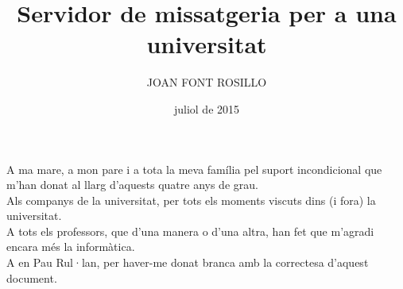 \documentclass[catalan,GINF]{TFGEPSUIB}
\title{Servidor de missatgeria per a una universitat}
\author{\MakeUppercase{Joan Font Rosillo}}
\date{juliol de 2015}
\begin{document}
\portada
\frontmatter

\cleartorecto \thispagestyle{empty}
\begin{agraiments}
A ma mare, a mon pare i a tota la meva família pel suport incondicional que m'han donat al llarg d'aquests quatre anys de grau.\\

Als companys de la universitat, per tots els moments viscuts dins (i fora) la universitat.\\

A tots els professors, que d'una manera o d'una altra, han fet que m'agradi encara més la informàtica.\\

A en Pau Rul·lan, per haver-me donat branca amb la correctesa d'aquest document.\\
\end{agraiments}

\cleartorecto \tableofcontents
\cleartorecto \listoffigures
\cleartorecto \listoftables 

 

 
\mainmatter\pagestyle{ruled}







\appendix 




\backmatter




\end{document}
